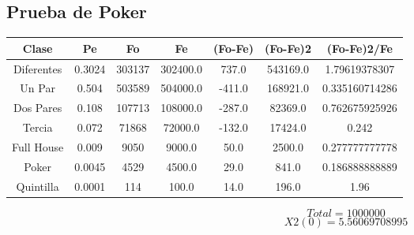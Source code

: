 \documentclass{article}
\begin{document}
\subsection{Prueba de Poker}
\begin{tabular}{|c|c|c|c|c|c|c|}
Clase&Pe&Fo&Fe&(Fo{-}Fe)&(Fo{-}Fe)2&(Fo{-}Fe)2/Fe\\
\hline
Diferentes&0.3024&303137&302400.0&737.0&543169.0&1.79619378307\\
\hline
Un Par&0.504&503589&504000.0&{-}411.0&168921.0&0.335160714286\\
\hline
Dos Pares&0.108&107713&108000.0&{-}287.0&82369.0&0.762675925926\\
\hline
Tercia&0.072&71868&72000.0&{-}132.0&17424.0&0.242\\
\hline
Full House&0.009&9050&9000.0&50.0&2500.0&0.277777777778\\
\hline
Poker&0.0045&4529&4500.0&29.0&841.0&0.186888888889\\
\hline
Quintilla&0.0001&114&100.0&14.0&196.0&1.96\\
\end{tabular}
$$
Total = 1000000
$$
$$
X2(0) = 5.56069708995
$$
\end{document}
